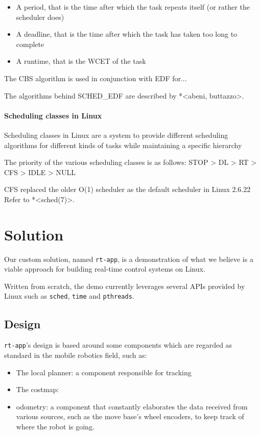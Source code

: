 \documentclass[a4paper,12pt]{report}
\begin{document}
\begin{itemize}
    \item A period, that is the time after which the task repeats itself (or rather the scheduler does)
    \item A deadline, that is the time after which the task has taken too long to complete
    \item A runtime, that is the WCET of the task
\end{itemize}

The CBS algorithm is used in conjunction with EDF for...

The algorithms behind SCHED\_EDF are described by *<abeni, buttazzo>.

\subsubsection{Scheduling classes in Linux}

Scheduling classes in Linux are a system to provide different scheduling algorithms for different kinds of tasks while maintaining a specific hierarchy 

The priority of the various scheduling classes is as follows:
STOP > DL > RT > CFS > IDLE > NULL

CFS replaced the older O(1) scheduler as the default scheduler in Linux 2.6.22 %
Refer to *<sched(7)>.

\newpage
\chapter{Solution}

Our custom solution, named \texttt{rt-app}, is a demonstration of what we believe is a viable approach for building real-time control systems on Linux.

Written from scratch, the demo currently leverages several APIs provided by Linux such as \texttt{sched}, \texttt{time} and \texttt{pthreads}.

\section{Design}

\texttt{rt-app}'s design is based around some components which are regarded as 
standard in the mobile robotics field, such as:
\begin{itemize}
  \item The local planner: a component responsible for tracking
  \item The costmap:
  \item odometry: a component that constantly elaborates the data received from various sources, such as the move base's wheel encoders, to keep track of where the robot is going.
\end{itemize}
\end{document}

